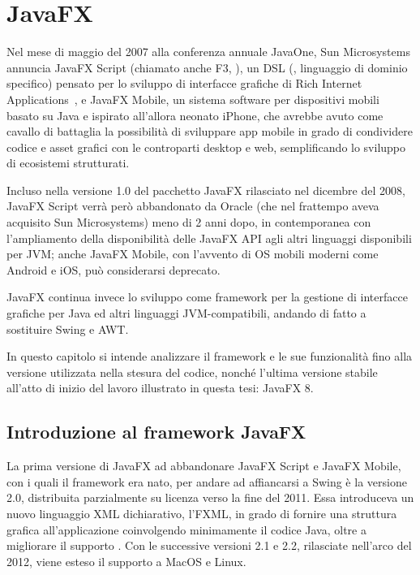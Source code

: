     \section{JavaFX}\label{sec:jfx}
        Nel mese di maggio del 2007 alla conferenza annuale JavaOne, Sun Microsystems annuncia JavaFX Script (chiamato anche F3, ), un DSL (, linguaggio di dominio specifico) pensato per lo sviluppo di interfacce grafiche di Rich Internet Applications~\cite{moritz2008rich}, e JavaFX Mobile, un sistema software per dispositivi mobili basato su Java e ispirato all'allora neonato iPhone, che avrebbe avuto come cavallo di battaglia la possibilità di sviluppare app mobile in grado di condividere codice e asset grafici con le controparti desktop e web, semplificando lo sviluppo di ecosistemi strutturati.

        Incluso nella versione 1.0 del pacchetto JavaFX rilasciato nel dicembre del 2008, JavaFX Script verrà però abbandonato da Oracle (che nel frattempo aveva acquisito Sun Microsystems) meno di 2 anni dopo, in contemporanea con l'ampliamento della disponibilità delle JavaFX API agli altri linguaggi disponibili per JVM; anche JavaFX Mobile, con l'avvento di OS mobili moderni come Android e iOS, può considerarsi deprecato.

        JavaFX continua invece lo sviluppo come framework per la gestione di interfacce grafiche per Java ed altri linguaggi JVM-compatibili, andando di fatto a sostituire Swing e AWT.

        In questo capitolo si intende analizzare il framework e le sue funzionalità fino alla versione utilizzata nella stesura del codice, nonché l'ultima versione stabile all'atto di inizio del lavoro illustrato in questa tesi: JavaFX 8.

        \subsection{Introduzione al framework JavaFX}\label{sub:jfxIntro}
            La prima versione di JavaFX ad abbandonare JavaFX Script e JavaFX Mobile, con i quali il framework era nato, per andare ad affiancarsi a Swing è la versione 2.0, distribuita parzialmente su licenza  verso la fine del 2011.
            Essa introduceva un nuovo linguaggio XML dichiarativo, l'FXML, in grado di fornire una struttura grafica all'applicazione coinvolgendo minimamente il codice Java, oltre a migliorare il supporto .
            Con le successive versioni 2.1 e 2.2, rilasciate nell'arco del 2012, viene esteso il supporto a MacOS e Linux.

